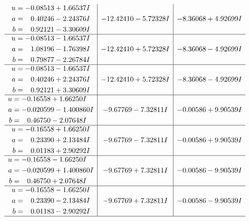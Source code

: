 \documentclass[1p]{elsarticle_modified}
\theoremstyle{definition}
\begin{document}
$$\begin{array}{c|c|c}
\begin{aligned}
u &= -0.08513 + 1.66537 I \\
a &= \phantom{-}0.40246 - 2.24376 I \\
b &= \phantom{-}0.92121 - 3.30609 I\end{aligned}
 & -12.42410 - 5.72328 I & -8.36068 + 4.92699 I \\ \hline\begin{aligned}
u &= -0.08513 - 1.66537 I \\
a &= \phantom{-}1.08196 - 1.76398 I \\
b &= \phantom{-}0.79877 - 2.26784 I\end{aligned}
 & -12.42410 + 5.72328 I & -8.36068 - 4.92699 I \\ \hline\begin{aligned}
u &= -0.08513 - 1.66537 I \\
a &= \phantom{-}0.40246 + 2.24376 I \\
b &= \phantom{-}0.92121 + 3.30609 I\end{aligned}
 & -12.42410 + 5.72328 I & -8.36068 - 4.92699 I \\ \hline\begin{aligned}
u &= -0.16558 + 1.66250 I \\
a &= -0.020599 - 1.400860 I \\
b &= \phantom{-}0.46750 - 2.07648 I\end{aligned}
 & -9.67769 - 7.32811 I & -0.00586 + 9.90539 I \\ \hline\begin{aligned}
u &= -0.16558 + 1.66250 I \\
a &= \phantom{-}0.23390 + 2.13484 I \\
b &= \phantom{-}0.01183 + 2.90292 I\end{aligned}
 & -9.67769 - 7.32811 I & -0.00586 + 9.90539 I \\ \hline\begin{aligned}
u &= -0.16558 - 1.66250 I \\
a &= -0.020599 + 1.400860 I \\
b &= \phantom{-}0.46750 + 2.07648 I\end{aligned}
 & -9.67769 + 7.32811 I & -0.00586 - 9.90539 I \\ \hline\begin{aligned}
u &= -0.16558 - 1.66250 I \\
a &= \phantom{-}0.23390 - 2.13484 I \\
b &= \phantom{-}0.01183 - 2.90292 I\end{aligned}
 & -9.67769 + 7.32811 I & -0.00586 - 9.90539 I\\
 \hline 
 \end{array}$$\newpage\newpage\renewcommand{\arraystretch}{1}
\end{document}

